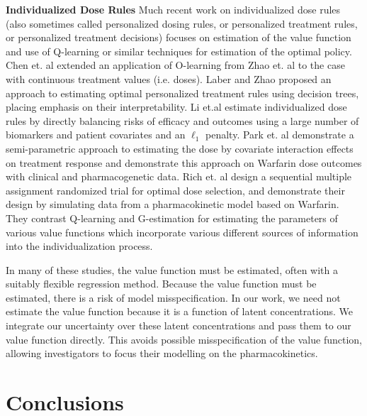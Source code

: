 \textbf{Individualized Dose Rules} Much recent work on individualized dose rules (also sometimes called personalized dosing rules, or personalized treatment rules, or personalized treatment decisions) focuses on estimation of the value function and use of Q-learning or similar techniques for estimation of the optimal policy. Chen et. al \cite{chen2016personalized} extended an application of O-learning from Zhao et. al \cite{zhao2012estimating} to the case with continuous treatment values (i.e. doses).  Laber and Zhao \cite{laber2015tree} proposed an approach to estimating optimal personalized treatment rules using decision trees, placing emphasis on their interpretability. Li et.al \cite{li2020utility} estimate individualized dose rules by directly balancing risks of efficacy and outcomes using a large number of biomarkers and patient covariates and an $\ell_1$ penalty. Park et. al \cite{park2021single} demonstrate a semi-parametric approach to estimating the dose by covariate interaction effects on treatment response and demonstrate this approach on Warfarin dose outcomes with clinical and pharmacogenetic data.  Rich et. al \cite{rich2014simulating} design a sequential multiple assignment randomized trial for optimal dose selection, and demonstrate their design by simulating data from a pharmacokinetic model based on Warfarin. They contrast Q-learning and G-estimation for estimating the parameters of various value functions which incorporate various different sources of information into the individualization process.

In many of these studies, the value function must be estimated, often with a suitably flexible regression method.  Because the value function must be estimated, there is a risk of model misspecification.  In our work, we need not estimate the value function because it is a function of latent concentrations.  We integrate our uncertainty over these latent concentrations and pass them to our value function directly.  This avoids possible misspecification of the value function, allowing investigators to focus their modelling on the pharmacokinetics.


\section{Conclusions}\label{ss:discussion}


